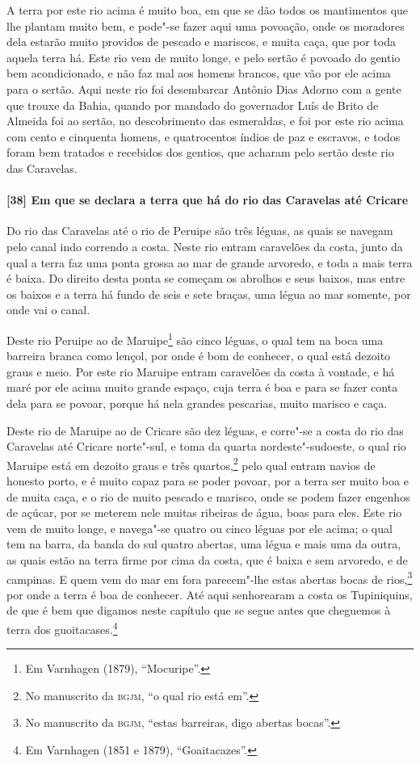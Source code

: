 A terra por este rio acima é muito boa, em que se dão todos os mantimentos que lhe plantam
muito bem, e pode"-se fazer aqui uma povoação, onde os moradores dela estarão muito
providos de pescado e mariscos, e muita caça, que por toda aquela terra há. Este rio vem
de muito longe, e pelo sertão é povoado do gentio bem acondicionado, e não faz mal aos
homens brancos, que vão por ele acima para o sertão. Aqui neste rio foi desembarcar
Antônio Dias Adorno com a gente que trouxe da Bahia, quando por mandado do governador Luís
de Brito de Almeida foi ao sertão, no descobrimento das esmeraldas, e foi por este rio
acima com cento e cinquenta homens, e quatrocentos índios de paz e escravos, e todos foram
bem tratados e recebidos dos gentios, que acharam pelo sertão deste rio das Caravelas.

\paragraph{[38] Em que se declara a terra que há do rio das Caravelas até Cricare} \quad
Do rio das Caravelas até o rio de Peruipe são três léguas, as quais se navegam pelo canal
indo correndo a costa. Neste rio entram caravelões da costa, junto da qual a terra faz uma
ponta grossa ao mar de grande arvoredo, e toda a mais terra é baixa. Do direito desta
ponta se começam os abrolhos e seus baixos, mas entre os baixos e a terra há fundo de seis
e sete braças, uma légua ao mar somente, por onde vai o canal.

Deste rio Peruipe ao de Maruipe\footnote{ Em Varnhagen (1879), ``Mocuripe''.} são cinco
léguas, o qual tem na boca uma barreira branca como lençol, por onde é bom de conhecer, o
qual está dezoito graus e meio. Por este rio Maruipe entram caravelões da costa à vontade,
e há maré por ele acima muito grande espaço, cuja terra é boa e para se fazer conta dela
para se povoar, porque há nela grandes pescarias, muito marisco e caça.

Deste rio de Maruipe ao de Cricare são dez léguas, e corre"-se a costa do rio das Caravelas
até Cricare norte"-sul, e toma da quarta nordeste"-sudoeste, o qual rio Maruipe está em
dezoito graus e três quartos,\footnote{ No manuscrito da \textsc{bgjm}, ``o qual rio está
em''.} pelo qual entram navios de honesto porto, e é muito capaz para se poder povoar, por
a terra ser muito boa e de muita caça, e o rio de muito pescado e marisco, onde se podem
fazer engenhos de açúcar, por se meterem nele muitas ribeiras de água, boas para eles.
Este rio vem de muito longe, e navega"-se quatro ou cinco léguas por ele acima; o qual tem
na barra, da banda do sul quatro abertas, uma légua e mais uma da outra, as quais estão na
terra firme por cima da costa, que é baixa e sem arvoredo, e de campinas. E quem vem do
mar em fora parecem"-lhe estas abertas bocas de rios,\footnote{ No manuscrito da
\textsc{bgjm}, ``estas barreiras, digo abertas bocas''.} por onde a terra é boa de
conhecer. Até aqui senhorearam a costa os Tupiniquins, de que é bem que digamos neste
capítulo que se segue antes que cheguemos à terra dos guoitacases.\footnote{ Em Varnhagen
(1851 e 1879), ``Goaitacazes''.}

